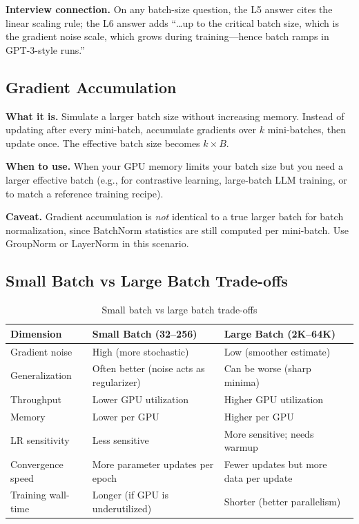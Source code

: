 \textbf{Interview connection.} On any batch-size question, the L5 answer cites the linear scaling rule; the L6 answer adds ``\ldots up to the critical batch size, which is the gradient noise scale, which grows during training---hence batch ramps in GPT-3-style runs.''

\subsection{Gradient Accumulation}

\textbf{What it is.} Simulate a larger batch size without increasing memory. Instead of updating after every mini-batch, accumulate gradients over $k$ mini-batches, then update once. The effective batch size becomes $k \times B$.

\textbf{When to use.} When your GPU memory limits your batch size but you need a larger effective batch (e.g., for contrastive learning, large-batch LLM training, or to match a reference training recipe).

\textbf{Caveat.} Gradient accumulation is \textit{not} identical to a true larger batch for batch normalization, since BatchNorm statistics are still computed per mini-batch. Use GroupNorm or LayerNorm in this scenario.

\subsection{Small Batch vs Large Batch Trade-offs}

\begin{table}[H]
\centering
\caption{Small batch vs large batch trade-offs}
\begin{tabularx}{\textwidth}{lXX}
\toprule
\textbf{Dimension} & \textbf{Small Batch (32--256)} & \textbf{Large Batch (2K--64K)} \\
\midrule
Gradient noise & High (more stochastic) & Low (smoother estimate) \\
Generalization & Often better (noise acts as regularizer) & Can be worse (sharp minima) \\
Throughput & Lower GPU utilization & Higher GPU utilization \\
Memory & Lower per GPU & Higher per GPU \\
LR sensitivity & Less sensitive & More sensitive; needs warmup \\
Convergence speed & More parameter updates per epoch & Fewer updates but more data per update \\
Training wall-time & Longer (if GPU is underutilized) & Shorter (better parallelism) \\
\bottomrule
\end{tabularx}
\end{table}

